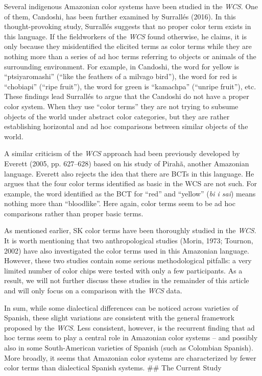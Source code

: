 \documentclass[
  english,
  ,man,floatsintext]{apa6}
\begin{document}
Several indigenous Amazonian color systems have been studied in the \emph{WCS}. One of them, Candoshi, has been further examined by Surrallés (2016). In this thought-provoking study, Surrallés suggests that no proper color term exists in this language. If the fieldworkers of the \emph{WCS} found otherwise, he claims, it is only because they misidentified the elicited terms as color terms while they are nothing more than a series of ad hoc terms referring to objects or animals of the surrounding environment. For example, in Candoshi, the word for yellow is \enquote{ptsiyaromashi} (\enquote{like the feathers of a milvago bird}), the word for red is \enquote{chobiapi} (\enquote{ripe fruit}), the word for green is \enquote{kamachpa} (\enquote{unripe fruit}), etc. These findings lead Surrallés to argue that the Candoshi do not have a proper color system. When they use \enquote{color terms} they are not trying to subsume objects of the world under abstract color categories, but they are rather establishing horizontal and ad hoc comparisons between similar objects of the world.

A similar criticism of the \emph{WCS} approach had been previously developed by Everett (2005, pp. 627--628) based on his study of Pirahã, another Amazonian language. Everett also rejects the idea that there are BCTs in this language. He argues that the four color terms identified as basic in the WCS are not such. For example, the word identified as the BCT for \enquote{red} and \enquote{yellow} (\emph{bi i sai}) means nothing more than \enquote{bloodlike}. Here again, color terms seem to be ad hoc comparisons rather than proper basic terms.

As mentioned earlier, SK color terms have been thoroughly studied in the \emph{WCS}. It is worth mentioning that two anthropological studies (Morin, 1973; Tournon, 2002) have also investigated the color terms used in this Amazonian language. However, these two studies contain some serious methodological pitfalls: a very limited number of color chips were tested with only a few participants. As a result, we will not further discuss these studies in the remainder of this article and will only focus on a comparison with the \emph{WCS} data.

In sum, while some dialectical differences can be noticed across varieties of Spanish, these slight variations are consistent with the general framework proposed by the \emph{WCS}. Less consistent, however, is the recurrent finding that ad hoc terms seem to play a central role in Amazonian color systems -- and possibly also in some South-American varieties of Spanish (such as Colombian Spanish). More broadly, it seems that Amazonian color systems are characterized by fewer color terms than dialectical Spanish systems.
\#\# The Current Study
\end{document}
